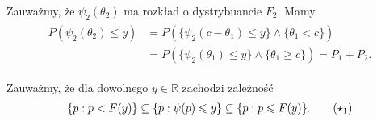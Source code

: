 \documentclass[12pt,a4paper,openany]{book}
\begin{document}
\noindent Zauważmy, że $\psi_{2}(\theta_{2})$ ma rozkład o dystrybuancie $F_{2}$. Mamy
\begin{gather}
\begin{split}
P(\psi_{2}(\theta_{2}) \leqslant y) &= P(\lbrace \psi_{2}(c-\theta_{1}) \leqslant y \rbrace  \wedge \lbrace \theta_{1} < c \rbrace) \nonumber \\
					  &= P(\lbrace \psi_{2}(\theta_{1}) \leqslant y \rbrace  \wedge \lbrace \theta_{1} \geqslant c \rbrace) = P_{1} + P_{2}. \nonumber
\end{split}
\end{gather}

\noindent Zauważmy, że dla dowolnego $y \in \mathbb{R}$ zachodzi zależność
\begin{gather}
\{p:p<F(y)\} \subseteq \{p:\psi(p) \leqslant y\} \subseteq \{p:p \leqslant F(y)\}. \tag{$\star_{1}$}
\end{gather}
\end{document}
